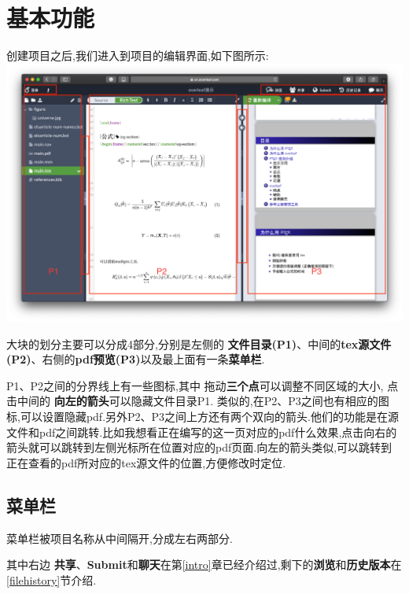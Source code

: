 \documentclass[]{ctexbook}
\begin{document}
\hypertarget{basic}{%
\chapter{基本功能}\label{basic}}

创建项目之后,我们进入到项目的编辑界面,如下图所示:
\includegraphics{figure/editepagemarked.png}

大块的划分主要可以分成4部分,分别是左侧的 \textbf{文件目录(P1)}、中间的\textbf{tex源文件(P2)}、右侧的\textbf{pdf预览(P3)}以及最上面有一条\textbf{菜单栏}.

P1、P2之间的分界线上有一些图标,其中 拖动\textbf{三个点}可以调整不同区域的大小, 点击中间的 \textbf{向左的箭头}可以隐藏文件目录P1.
类似的,在P2、P3之间也有相应的图标,可以设置隐藏pdf.另外P2、P3之间上方还有两个双向的箭头.他们的功能是在源文件和pdf之间跳转.比如我想看正在编写的这一页对应的pdf什么效果,点击向右的箭头就可以跳转到左侧光标所在位置对应的pdf页面.向左的箭头类似,可以跳转到正在查看的pdf所对应的tex源文件的位置,方便修改时定位.

\hypertarget{section-9}{%
\section{菜单栏}\label{section-9}}

菜单栏被项目名称从中间隔开,分成左右两部分.

其中右边 \textbf{共享}、\textbf{Submit}和\textbf{聊天}在第\ref{intro}章已经介绍过,剩下的\textbf{浏览}和\textbf{历史版本}在\ref{filehistory}节介绍.
\end{document}
